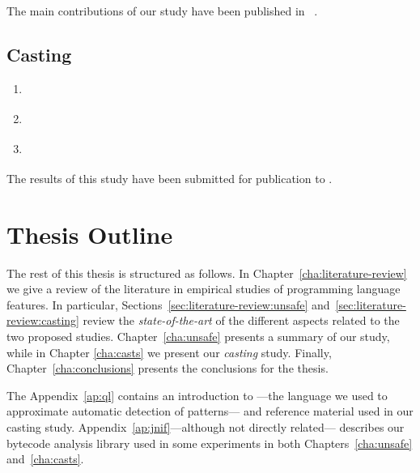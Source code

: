 The main contributions of our \unsafe{} \api{} study have been published in ~\citep{mastrangeloUseYourOwn2015}.

\subsection*{Casting}

\begin{enumerate}[label=$RQ/C\arabic*:$,leftmargin=3.4\parindent]
\item {\bf \crqA} \crqAdesc{}
\item {\bf \crqB} \crqBdesc{}
\item {\bf \crqC} \crqCdesc{}
\end{enumerate}

The results of this study have been submitted for publication to .


\section{Thesis Outline}

The rest of this thesis is structured as follows.
In Chapter~\ref{cha:literature-review} we give a review of the literature in empirical studies of programming language features.
In particular, Sections~\ref{sec:literature-review:unsafe} and~\ref{sec:literature-review:casting} review the \emph{state-of-the-art} of the different aspects related to the two proposed studies.
Chapter~\ref{cha:unsafe} presents a summary of our \unsafe{} study,
while in Chapter \ref{cha:casts} we present our \emph{casting} study.
Finally, Chapter~\ref{cha:conclusions} presents the conclusions for the thesis.

The Appendix~\ref{ap:ql} contains an introduction to \ql{}%
---the language we used to approximate automatic detection of patterns---%
and reference material used in our casting study.
Appendix~\ref{ap:jnif}---although not directly related---%
describes our bytecode analysis library used in some experiments in both Chapters~\ref{cha:unsafe} and~\ref{cha:casts}.
